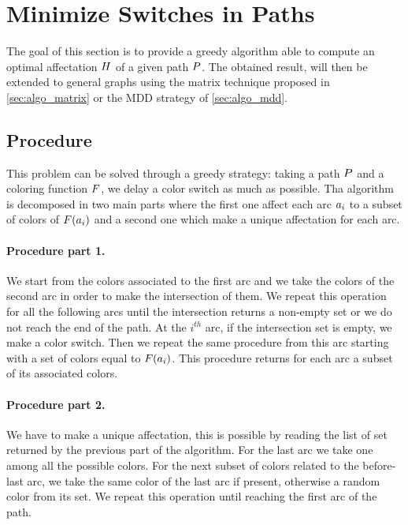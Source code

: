 \section{Minimize Switches in Paths}

The goal of this section is to provide a greedy algorithm able to compute an optimal affectation $H$ of a given path $P$. The obtained result, will then be extended to general graphs using the matrix technique proposed in \cref{sec:algo_matrix} or the MDD strategy of \cref{sec:algo_mdd}.

\subsection{Procedure}
\label{sec:path_proc}
This problem can be solved through a greedy strategy: taking a path $P$ and a coloring function $F$, we delay a color switch as much as possible. Tha algorithm is decomposed in two main parts where the first one affect each arc $a_i$ to a subset of colors of $F(a_i)$ and a second one which make a unique affectation for each arc.

\paragraph{Procedure part 1.}
We start from the colors associated to the first arc and we take the colors of the second arc in order to make the intersection of them. We repeat this operation for all the following arcs until the intersection returns a non-empty set or we do not reach the end of the path. At the $i^{th}$ arc, if the intersection set is empty, we make a color switch. Then we repeat the same procedure from this arc starting with a set of colors equal to $F(a_i)$. This procedure returns for each arc a subset of its associated colors.

\paragraph{Procedure part 2.}
We have to make a unique affectation, this is possible by reading the list of set returned by the previous part of the algorithm. For the last arc we take one among all the possible colors. For the next subset of colors related to the before-last arc, we take the same color of the last arc if present, otherwise a random color from its set. We repeat this operation until reaching the first arc of the path.

